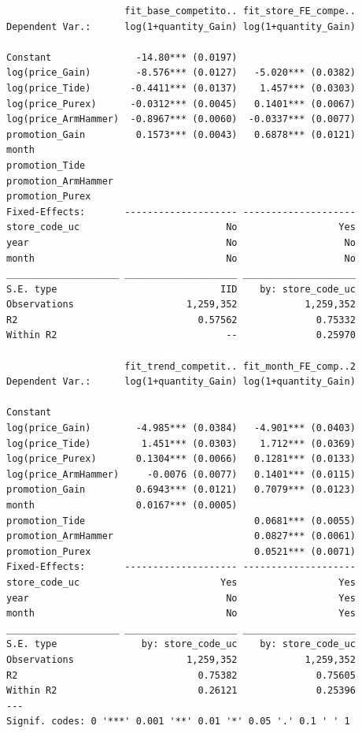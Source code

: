 \documentclass[
]{article}
\begin{document}
\begin{verbatim}
                     fit_base_competito.. fit_store_FE_compe..
Dependent Var.:      log(1+quantity_Gain) log(1+quantity_Gain)
                                                              
Constant               -14.80*** (0.0197)                     
log(price_Gain)        -8.576*** (0.0127)   -5.020*** (0.0382)
log(price_Tide)       -0.4411*** (0.0137)    1.457*** (0.0303)
log(price_Purex)      -0.0312*** (0.0045)   0.1401*** (0.0067)
log(price_ArmHammer)  -0.8967*** (0.0060)  -0.0337*** (0.0077)
promotion_Gain         0.1573*** (0.0043)   0.6878*** (0.0121)
month                                                         
promotion_Tide                                                
promotion_ArmHammer                                           
promotion_Purex                                               
Fixed-Effects:       -------------------- --------------------
store_code_uc                          No                  Yes
year                                   No                   No
month                                  No                   No
____________________ ____________________ ____________________
S.E. type                             IID    by: store_code_uc
Observations                    1,259,352            1,259,352
R2                                0.57562              0.75332
Within R2                              --              0.25970

                     fit_trend_competit.. fit_month_FE_comp..2
Dependent Var.:      log(1+quantity_Gain) log(1+quantity_Gain)
                                                              
Constant                                                      
log(price_Gain)        -4.985*** (0.0384)   -4.901*** (0.0403)
log(price_Tide)         1.451*** (0.0303)    1.712*** (0.0369)
log(price_Purex)       0.1304*** (0.0066)   0.1281*** (0.0133)
log(price_ArmHammer)     -0.0076 (0.0077)   0.1401*** (0.0115)
promotion_Gain         0.6943*** (0.0121)   0.7079*** (0.0123)
month                  0.0167*** (0.0005)                     
promotion_Tide                              0.0681*** (0.0055)
promotion_ArmHammer                         0.0827*** (0.0061)
promotion_Purex                             0.0521*** (0.0071)
Fixed-Effects:       -------------------- --------------------
store_code_uc                         Yes                  Yes
year                                   No                  Yes
month                                  No                  Yes
____________________ ____________________ ____________________
S.E. type               by: store_code_uc    by: store_code_uc
Observations                    1,259,352            1,259,352
R2                                0.75382              0.75605
Within R2                         0.26121              0.25396
---
Signif. codes: 0 '***' 0.001 '**' 0.01 '*' 0.05 '.' 0.1 ' ' 1
\end{verbatim}
\end{document}

